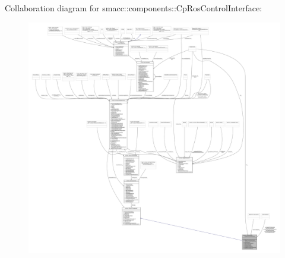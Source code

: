 Collaboration diagram for smacc\+:\+:components\+:\+:Cp\+Ros\+Control\+Interface\+:
\nopagebreak
\begin{figure}[H]
\begin{center}
\leavevmode
\includegraphics[width=350pt]{classsmacc_1_1components_1_1CpRosControlInterface__coll__graph}
\end{center}
\end{figure}
